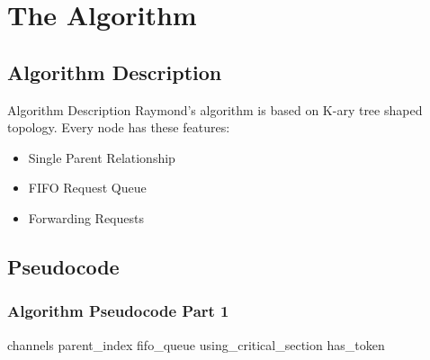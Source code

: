 \documentclass[11pt]{beamer}              %
\begin{document}
\section{The Algorithm}
\subsection{Algorithm Description}
\begin{frame}{Algorithm Description}
Raymond's algorithm is based on K-ary tree shaped topology. Every node has these features:

\begin{itemize}
    \item Single Parent Relationship
    \item FIFO Request Queue
    \item Forwarding Requests
\end{itemize}

\end{frame}


\subsection{Pseudocode}

\begin{frame}
\frametitle{Algorithm Pseudocode Part 1}

\begin{center}
\begin{algorithm}[H]
	\scriptsize
	\def\algorithmlabel{Raymond's}
    \caption{\algorithmlabel\ algorithm}
    \label{alg:raymondsalgorithm}
    \begin{algorithmic}[1]
    	\Implement {\algorithmlabel}{cf} 
    	 {channels} 
    	 {parent\_index} 
    	 {fifo\_queue}
    	 {using\_critical\_section}
         {has\_token}
	   \Need {}
    \end{algorithmic}
\end{algorithm}
\end{center}

\end{frame}
\end{document}
